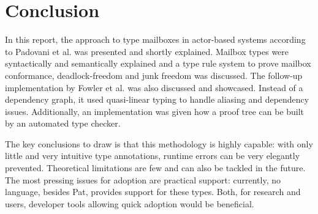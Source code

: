 \section{Conclusion}
\label{sec:conclusions}

In this report, the approach to type mailboxes in actor-based systems according to Padovani et al.\cite{deliguoroMailboxTypesUnordered2018} was presented and shortly explained. Mailbox types were syntactically and semantically explained and a type rule system to prove mailbox conformance, deadlock-freedom and junk freedom was discussed. The follow-up implementation by Fowler et al.\cite{fowlerSpecialDeliveryProgramming2023} was also discussed and showcased. Instead of a dependency graph, it used quasi-linear typing to handle aliasing and dependency issues. Additionally, an implementation was given how a proof tree can be built by an automated type checker.

The key conclusions to draw is that this methodology is highly capable: with only little and very intuitive type annotations, runtime errors can be very elegantly prevented.
Theoretical limitations are few and can also be tackled in the future.
The most pressing issues for adoption are practical support: currently, no language, besides Pat, provides support for these types. Both, for research and users, developer tools allowing quick adoption would be beneficial.


